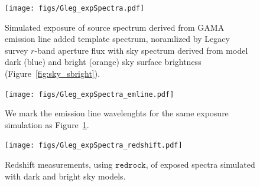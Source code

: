 \documentclass[12pt, letterpaper, preprint]{aastex}
\begin{document}
\begin{figure}
\begin{center}
    \texttt{[image: figs/Gleg\_expSpectra.pdf]}
    \caption{Simulated exposure of source spectrum derived from 
    GAMA emission line added template spectrum, noramlized by Legacy
    survey $r$-band aperture flux with sky spectrum derived from 
    model dark (blue) and bright (orange) sky surface brightness 
    (Figure~\ref{fig:sky_sbright}). 
    }
\label{fig:exp_spectra}
\end{center}
\end{figure}

\begin{figure}
\begin{center}
    \texttt{[image: figs/Gleg\_expSpectra\_emline.pdf]}
    \caption{We mark the emission line wavelenghts for the same exposure 
    simulation as Figure~\ref{fig:exp_spectra}.}
\label{fig:exp_spectra_emline}
\end{center}
\end{figure}

\begin{figure}
\begin{center}
    \texttt{[image: figs/Gleg\_expSpectra\_redshift.pdf]}
    \caption{Redshift measurements, using $\mathtt{redrock}$, of exposed spectra
    simulated with dark and bright sky models.}
\label{fig:exp_spectra_emline}
\end{center}
\end{figure}

%
\end{document}
